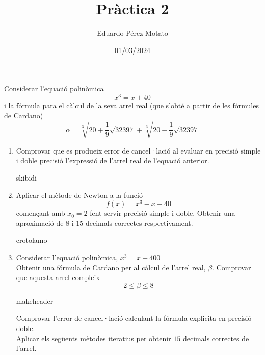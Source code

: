 \documentclass[a4paper, 12pt]{article}
\title{Pràctica 2}
\author{Eduardo Pérez Motato}
\date{01/03/2024}
\begin{document}
    \makeheader

    \begin{exercici}
        Considerar l'equació polinòmica
        \begin{equation}
            x^3 = x + 40
            \label{eq:1}
        \end{equation}
        i la fórmula para el càlcul de la seva arrel real (que s'obté a partir de les fórmules de
        Cardano)
        \begin{displaymath}
            \alpha = \sqrt[3]{20 + \frac{1}{9}\sqrt{32397}} + \sqrt[3]{20-\frac{1}{9}\sqrt{32397}}
        \end{displaymath}
        \begin{enumerate}[label=\alph*)]
            \item Comprovar que es produeix error de cancel·lació al evaluar en precisió simple i
            doble precisió l'expressió de l'arrel real de l'equació anterior.\\
            \begin{solucio}
                skibidi
            \end{solucio}
            \item Aplicar el mètode de Newton a la funció
            \begin{displaymath}
                f\left(x\right) = x^3-x-40 
            \end{displaymath}
            començant amb $x_0 = 2$ fent servir precisió simple i doble. Obtenir una aproximació de
            $8$ i $15$ decimals correctes respectivament.\\
            \begin{solucio}
                crotolamo
            \end{solucio}
            \item Considerar l'equació polinòmica, $x^3=x+400$\\
            Obtenir una fórmula de Cardano per al càlcul de l'arrel real, $\beta$. Comprovar que
            aquesta arrel compleix
            \begin{displaymath}
                2 \leq \beta \leq 8
            \end{displaymath}
            \begin{solucio}
                makeheader
            \end{solucio}
            Comprovar l'error de cancel·lació calculant la fórmula explicita en precisió doble.\\
            Aplicar els següents mètodes iteratius per obtenir $15$ decimals correctes de l'arrel.

\end{enumerate}
\end{exercici}
\end{document}
